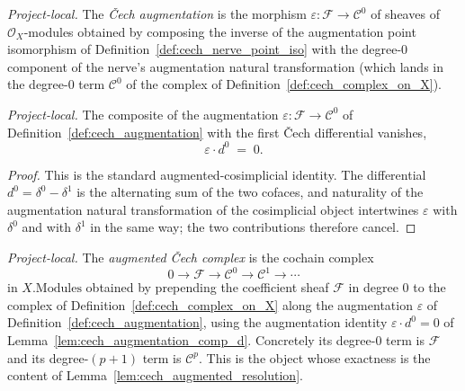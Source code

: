 \begin{definition}\leanok
  \label{def:cech_augmentation}
  \textit{Project-local.}
  The \emph{{\v C}ech augmentation} is the morphism \(\varepsilon : \mathcal{F} \to \mathcal{C}^0\) of
  sheaves of \(\mathcal{O}_X\)-modules obtained by composing the inverse of the augmentation point
  isomorphism of Definition~\ref{def:cech_nerve_point_iso} with the degree-\(0\) component of the
  nerve's augmentation natural transformation (which lands in the degree-\(0\) term \(\mathcal{C}^0\) of
  the complex of Definition~\ref{def:cech_complex_on_X}).
\end{definition}

\begin{lemma}
  \label{lem:cech_augmentation_comp_d}
  \textit{Project-local.}
  The composite of the augmentation \(\varepsilon : \mathcal{F} \to \mathcal{C}^0\) of
  Definition~\ref{def:cech_augmentation} with the first {\v C}ech differential vanishes,
  \[
    \varepsilon \cdot d^0 \;=\; 0.
  \]
\end{lemma}
\begin{proof}
  This is the standard augmented-cosimplicial identity. The differential \(d^0 = \delta^0 - \delta^1\)
  is the alternating sum of the two cofaces, and naturality of the augmentation natural transformation
  of the cosimplicial object intertwines \(\varepsilon\) with \(\delta^0\) and with \(\delta^1\) in the
  same way; the two contributions therefore cancel.
\end{proof}

\begin{definition}\leanok
  \label{def:cech_augmented_complex}
  \textit{Project-local.}
  The \emph{augmented {\v C}ech complex} is the cochain complex
  \[
    0 \to \mathcal{F} \to \mathcal{C}^0 \to \mathcal{C}^1 \to \cdots
  \]
  in \(X.\mathrm{Modules}\) obtained by prepending the coefficient sheaf \(\mathcal{F}\) in degree \(0\)
  to the complex of Definition~\ref{def:cech_complex_on_X} along the augmentation
  \(\varepsilon\) of Definition~\ref{def:cech_augmentation}, using the augmentation identity
  \(\varepsilon \cdot d^0 = 0\) of Lemma~\ref{lem:cech_augmentation_comp_d}. Concretely its degree-\(0\)
  term is \(\mathcal{F}\) and its degree-\((p+1)\) term is \(\mathcal{C}^p\). This is the object whose
  exactness is the content of Lemma~\ref{lem:cech_augmented_resolution}.
\end{definition}

